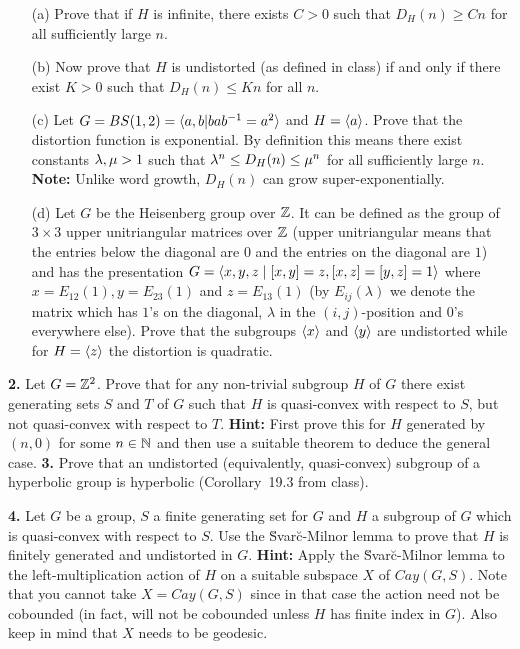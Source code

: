 \documentclass[12pt]{amsart}
\begin{document}
\begin{itemize}
\item[(a)] Prove that if $H$ is infinite, there exists $C>0$ such that $D_H(n)\geq Cn$ for all sufficiently large $n$.
\item[(b)] Now prove that $H$ is undistorted (as defined in class) if and only if there exist $K>0$
such that $D_H(n)\leq Kn$ for all $n$.
 
\item[(c)] Let $G=BS(1,2)={\langle} a,b | bab^{-1}=a^2{\rangle}$ and $H={\langle} a{\rangle}$. Prove that the distortion function is exponential. By
definition this means there exist constants ${\lambda},\mu>1$ such that ${\lambda}^n\leq  D_H(n)\leq \mu^n$ for all sufficiently large $n$.
{\bf Note:} Unlike word growth, $D_H(n)$ can grow super-exponentially.
\item[(d)] Let $G$ be the Heisenberg group over ${\mathbb Z}$. It can be defined as the group of $3\times 3$ upper unitriangular matrices
over ${\mathbb Z}$ (upper unitriangular means that the entries below the diagonal are $0$ and the entries on the diagonal are $1$)
and has the presentation $G={\langle} x,y,z \mid [x,y]=z, [x,z]=[y,z]=1{\rangle}$ where $x=E_{12}(1), y=E_{23}(1)$ and $z=E_{13}(1)$ (by
$E_{ij}(\lambda)$ we denote the matrix which has $1$'s on the diagonal, $\lambda$ in the $(i,j)$-position and $0$'s everywhere else).
Prove that the subgroups ${\langle} x{\rangle}$ and ${\langle} y{\rangle}$ are undistorted while for $H={\langle} z{\rangle}$ the distortion is quadratic.
\end{itemize}

{\bf 2.} Let $G={\mathbb Z}^2$. Prove that for any non-trivial subgroup $H$ of $G$ there exist generating sets $S$ and $T$ of $G$ such that
$H$ is quasi-convex with respect to $S$, but not quasi-convex with respect to $T$. {\bf Hint:} First prove this
for $H$ generated by $(n,0)$ for some $n\in{\mathbb N}$ and then use a suitable theorem to deduce the general case.
\skv
{\bf 3.} Prove that an undistorted (equivalently, quasi-convex) subgroup of a hyperbolic group is hyperbolic (Corollary~19.3 from class).

\skv
{\bf 4.} Let $G$ be a group, $S$ a finite generating set for $G$ and $H$ a subgroup of $G$ which is quasi-convex with respect to $S$.
Use the  \u Svar\u c-Milnor lemma to prove that $H$ is finitely generated and undistorted in $G$. {\bf Hint:} Apply the 
 \u Svar\u c-Milnor lemma to the left-multiplication action of $H$ on a suitable subspace $X$ of $Cay(G,S)$. Note that you cannot
 take $X=Cay(G,S)$ since in that case the action need not be cobounded (in fact, will not be cobounded unless $H$ has finite index in $G$).
 Also keep in mind that $X$ needs to be geodesic.
\end{document}
